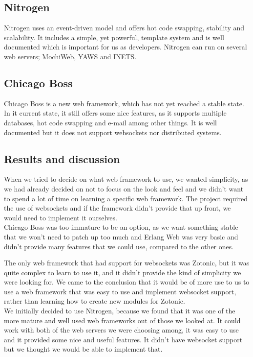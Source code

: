 \documentclass[11pt,a4paper]{report}
\begin{document}
\subsection{Nitrogen}
Nitrogen uses an event-driven model and offers hot code swapping, stability
and scalability. It includes a simple, yet powerful, template system and is
well documented which is important for us as developers. Nitrogen can run on
several web servers; MochiWeb, YAWS and INETS.
\subsection{Chicago Boss}
Chicago Boss is a new web framework, which has not yet reached a stable state.
In it current state, it still offers some nice features, as it supports multiple
databases, hot code swapping and e-mail among other things. It is well
documented but it does not support websockets nor distributed systems.
\subsection{Results and discussion}
When we tried to decide on what web framework to use, we wanted simplicity, as
we had already decided on not to focus on the look and feel and we didn't want
to spend a lot of time on learning a specific web framework.
The project required the use of websockets and if the framework didn't
provide that up front, we would need to implement it ourselves.\\

Chicago Boss was too immature to be an option, as we want something stable that
we won't need to patch up too much and Erlang Web was very basic and didn't
provide many features that we could use, compared to the other ones.

The only web framework that had support for websockets was Zotonic, but it was
quite complex to learn to use it, and it didn't provide the kind of simplicity
we were looking for. We came to the conclusion that it would be of more use to
us to use a web framework that was easy to use and implement websocket support,
rather than learning how to create new modules for Zotonic.\\

We initially decided to use Nitrogen, because we found that it was one of the
more mature and well used web frameworks out of those we looked at. It could
work with both of the web servers we were choosing among, it was easy to use and
it provided some nice and useful features. It didn't have websocket support but
we thought we would be able to implement that.
\end{document}
